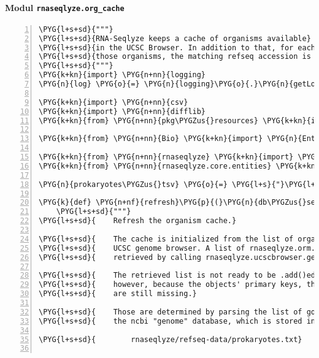\paragraph{Modul \texttt{rnaseqlyze.org\_cache}}
\label{rnaseqlyze-pdf:modul-rnaseqlyze-org-cache}
\begin{Verbatim}[commandchars=\\\{\},numbers=left,firstnumber=1,stepnumber=5]
\PYG{l+s+sd}{"""}
\PYG{l+s+sd}{RNA-Seqlyze keeps a cache of organisms available}
\PYG{l+s+sd}{in the UCSC Browser. In addition to that, for each of}
\PYG{l+s+sd}{those organisms, the matching refseq accession is cached.}
\PYG{l+s+sd}{"""}
\PYG{k+kn}{import} \PYG{n+nn}{logging}
\PYG{n}{log} \PYG{o}{=} \PYG{n}{logging}\PYG{o}{.}\PYG{n}{getLogger}\PYG{p}{(}\PYG{n}{\PYGZus{}\PYGZus{}name\PYGZus{}\PYGZus{}}\PYG{p}{)}

\PYG{k+kn}{import} \PYG{n+nn}{csv}
\PYG{k+kn}{import} \PYG{n+nn}{difflib}
\PYG{k+kn}{from} \PYG{n+nn}{pkg\PYGZus{}resources} \PYG{k+kn}{import} \PYG{n}{resource\PYGZus{}stream}

\PYG{k+kn}{from} \PYG{n+nn}{Bio} \PYG{k+kn}{import} \PYG{n}{Entrez}

\PYG{k+kn}{from} \PYG{n+nn}{rnaseqlyze} \PYG{k+kn}{import} \PYG{n}{ucscbrowser}
\PYG{k+kn}{from} \PYG{n+nn}{rnaseqlyze.core.entities} \PYG{k+kn}{import} \PYG{n}{UCSCOrganism}

\PYG{n}{prokaryotes\PYGZus{}tsv} \PYG{o}{=} \PYG{l+s}{"}\PYG{l+s}{refseq-data/prokaryotes.txt}\PYG{l+s}{"}

\PYG{k}{def} \PYG{n+nf}{refresh}\PYG{p}{(}\PYG{n}{db\PYGZus{}session}\PYG{p}{)}\PYG{p}{:}
    \PYG{l+s+sd}{"""}
\PYG{l+s+sd}{    Refresh the organism cache.}

\PYG{l+s+sd}{    The cache is initialized from the list of organisms available in the}
\PYG{l+s+sd}{    UCSC genome browser. A list of rnaseqlyze.orm.UCSCOrganism's is}
\PYG{l+s+sd}{    retrieved by calling rnaseqlyze.ucscbrowser.get\PYGZus{}org\PYGZus{}list().}

\PYG{l+s+sd}{    The retrieved list is not ready to be .add()ed to the :param:db\PYGZus{}session}
\PYG{l+s+sd}{    however, because the objects' primary keys, the refseq accession,}
\PYG{l+s+sd}{    are still missing.}

\PYG{l+s+sd}{    Those are determined by parsing the list of gomplete genomes available in}
\PYG{l+s+sd}{    the ncbi "genome" database, which is stored in}

\PYG{l+s+sd}{        rnaseqlyze/refseq-data/prokaryotes.txt}


\end{Verbatim}
